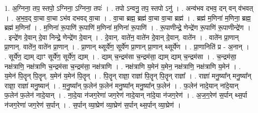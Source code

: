 \documentclass[17pt]{extarticle}
\begin{document}
1. अ॒ग्निना॒ तप॒ स्तपो॒ ऽग्निना॒ ऽग्निना॒ तपः॑ । . तपो ऽन्वनु॒ तप॒ स्तपो ऽनु॑ । . अन्व॑भव दभव॒ दन् वन् व॑भवत् । . अ॒भ॒व॒द् वा॒चा वा॒चा ऽभ॑व दभवद् वा॒चा । . वा॒चा ब्रह्म॒ ब्रह्म॑ वा॒चा वा॒चा ब्रह्म॑ । . ब्रह्म॑ म॒णिना॑ म॒णिना॒ ब्रह्म॒ ब्रह्म॑ म॒णिना᳚ । . म॒णिना॑ रू॒पाणि॑ रू॒पाणि॑ म॒णिना॑ म॒णिना॑ रू॒पाणि॑ । . रू॒पाणीन्द्रे॒ णेन्द्रे॑ण रू॒पाणि॑ रू॒पाणीन्द्रे॑ण । . इन्द्रे॑ण दे॒वान् दे॒वा निन्द्रे॒ णेन्द्रे॑ण दे॒वान् । . दे॒वान्. वाते॑न॒ वाते॑न दे॒वान् दे॒वान्. वाते॑न । . वाते॑न प्रा॒णान् प्रा॒णान्. वाते॑न॒ वाते॑न प्रा॒णान् । . प्रा॒णान् थ्सूर्ये॑ण॒ सूर्ये॑ण प्रा॒णान् प्रा॒णान् थ्सूर्ये॑ण । . प्रा॒णानिति॑ प्र - अ॒नान् । . सूर्ये॑ण॒ द्याम् द्याꣳ सूर्ये॑ण॒ सूर्ये॑ण॒ द्याम् । . द्याम् च॒न्द्रम॑सा च॒न्द्रम॑सा॒ द्याम् द्याम् च॒न्द्रम॑सा । . च॒न्द्रम॑सा॒ नक्ष॑त्राणि॒ नक्ष॑त्राणि च॒न्द्रम॑सा च॒न्द्रम॑सा॒ नक्ष॑त्राणि । . नक्ष॑त्राणि य॒मेन॑ य॒मेन॒ नक्ष॑त्राणि॒ नक्ष॑त्राणि य॒मेन॑ । . य॒मेन॑ पि॒तॄन् पि॒तॄन्. य॒मेन॑ य॒मेन॑ पि॒तॄन् । . पि॒तॄन् राज्ञा॒ राज्ञा॑ पि॒तॄन् पि॒तॄन् राज्ञा᳚ । . राज्ञा॑ मनु॒ष्या᳚न् मनु॒ष्या᳚न् राज्ञा॒ राज्ञा॑ मनु॒ष्यान्॑ । . म॒नु॒ष्या᳚न् फ॒लेन॑ फ॒लेन॑ मनु॒ष्या᳚न् मनु॒ष्या᳚न् फ॒लेन॑ । . फ॒लेन॑ नादे॒यान् ना॑दे॒यान् फ॒लेन॑ फ॒लेन॑ नादे॒यान् । . ना॒दे॒या न॑जग॒रेणा॑ जग॒रेण॑ नादे॒यान् ना॑दे॒या न॑जग॒रेण॑ । . अ॒ज॒ग॒रेण॑ स॒र्पान् थ्स॒र्पा न॑जग॒रेणा॑ जग॒रेण॑ स॒र्पान् । . स॒र्पान् व्या॒घ्रेण॑ व्या॒घ्रेण॑ स॒र्पान् थ्स॒र्पान् व्या॒घ्रेण॑ । \newline
\end{document}
